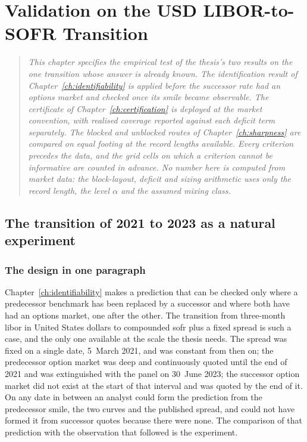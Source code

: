 \documentclass[../../../main.tex]{subfiles}
\begin{document}
\chapter{Validation on the USD LIBOR-to-SOFR Transition}\label{ch6-usd-validation}\label{ch:usd}

\begin{quote}\itshape
This chapter specifies the empirical test of the thesis's two results on the one transition whose answer is already known. The identification result of Chapter~\ref{ch:identifiability} is applied before the successor rate had an options market and checked once its smile became observable. The certificate of Chapter~\ref{ch:certification} is deployed at the market convention, with realised coverage reported against each deficit term separately. The blocked and unblocked routes of Chapter~\ref{ch:sharpness} are compared on equal footing at the record lengths available. Every criterion precedes the data, and the grid cells on which a criterion cannot be informative are counted in advance. No number here is computed from market data: the block-layout, deficit and sizing arithmetic uses only the record length, the level $\alpha$ and the assumed mixing class.
\end{quote}

\section{The transition of 2021 to 2023 as a natural experiment}\label{sec:usd-experiment}

\subsection{The design in one paragraph}

Chapter~\ref{ch:identifiability} makes a prediction that can be checked only where a predecessor benchmark has been replaced by a successor and where both have had an options market, one after the other. The transition from three-month \gls{libor} in United States dollars to compounded \gls{sofr} plus a fixed spread is such a case, and the only one available at the scale the thesis needs. The spread was fixed on a single date, 5~March 2021, and was constant from then on; the predecessor option market was deep and continuously quoted until the end of 2021 and was extinguished with the panel on 30~June 2023; the successor option market did not exist at the start of that interval and was quoted by the end of it. On any date in between an analyst could form the prediction from the predecessor smile, the two curves and the published spread, and could not have formed it from successor quotes because there were none. The comparison of that prediction with the observation that followed is the experiment.
\end{document}
